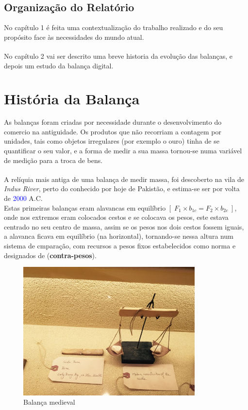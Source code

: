 \section{Organização do Relatório}
No capítulo 1 é feita uma contextualização do trabalho realizado e do seu propósito face às necessidades do mundo atual.\\
\\
No capítulo 2 vai ser descrito uma breve historia da evolução das balanças, e depois um estudo da balança digital.
\chapter{História da Balança}
As balanças foram criadas por necessidade durante o desenvolvimento do comercio na antiguidade. Os produtos que não recorriam a contagem por unidades, tais como objetos irregulares (por exemplo o ouro) tinha de se quantificar o seu valor, e a forma de medir a sua massa tornou-se numa variável de medição para a troca de bens.
\\
\\
A relíquia mais antiga de uma balança de medir massa, foi descoberto na vila de \textit{Indus River}, perto do conhecido por hoje de Pakistão, e estima-se ser por volta de \textcolor{blue}{2000} A.C.
\\
Estas primeiras balanças eram alavancas em equilíbrio $[ \; F_{1} \times b_{1c} = F_{2} \times b_{2c} \; ]$, onde nos extremos eram colocados cestos e se colocava os pesos, este estava centrado no seu centro de massa, assim se os pesos nos dois cestos fossem iguais, a alavanca ficava em equilíbrio (na horizontal), tornando-se nessa altura num sistema de cmparação, com recursos a pesos fixos estabelecidos como norma e designados de (\textbf{contra-pesos}).
\\
\begin{minipage}[!b]{0.45\linewidth}
	\begin{figure}[H]
		\centering
		\includegraphics[height=7cm]{./image/PESTA/general/balanca_1.jpg}
		\caption{Balança medieval}
		\label{balanca_1}
	\end{figure}
\end{minipage}
